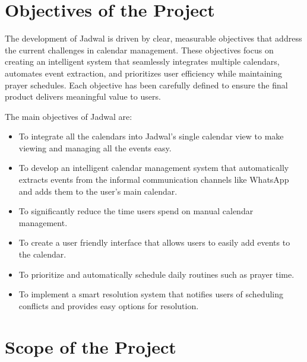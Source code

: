 \documentclass[12pt,a4paper,twoside]{report}
\begin{document}
\section{Objectives of the Project}

The development of Jadwal is driven by clear, measurable objectives that address the current challenges in calendar management. These objectives focus on creating an intelligent system that seamlessly integrates multiple calendars, automates event extraction, and prioritizes user efficiency while maintaining prayer schedules. Each objective has been carefully defined to ensure the final product delivers meaningful value to users.

The main objectives of Jadwal are:
\begin{itemize}

    \item To integrate all the calendars into Jadwal's single calendar view to make viewing and managing all the events easy.
    \item To develop an intelligent calendar management system that automatically extracts events from the informal communication channels like WhatsApp and adds them to the user's main calendar.
    \item To significantly reduce the time users spend on manual calendar management.
    \item To create a user friendly interface that allows users to easily add events to the calendar.
    \item To prioritize and automatically schedule daily routines such as prayer time.
    \item To implement a smart resolution system that notifies users of scheduling conflicts and provides easy options for resolution.
\end{itemize}

\section{Scope of the Project}
\end{document}
